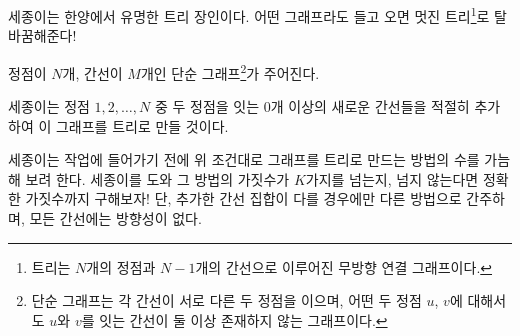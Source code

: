 세종이는 한양에서 유명한 트리 장인이다. 어떤 그래프라도 들고 오면 멋진 트리\footnote{트리는 $N$개의 정점과 $N-1$개의 간선으로 이루어진 무방향 연결 그래프이다.}로 탈바꿈해준다!

정점이 $N$개, 간선이 $M$개인 단순 그래프\footnote{단순 그래프는 각 간선이 서로 다른 두 정점을 이으며, 어떤 두 정점 $u$, $v$에 대해서도 $u$와 $v$를 잇는 간선이 둘 이상 존재하지 않는 그래프이다.}가 주어진다.

세종이는 정점 $1, 2, \ldots, N$ 중 두 정점을 잇는 $0$개 이상의 새로운 간선들을 적절히 추가하여 이 그래프를 트리로 만들 것이다.

세종이는 작업에 들어가기 전에 위 조건대로 그래프를 트리로 만드는 방법의 수를 가늠해 보려 한다. 세종이를 도와 그 방법의 가짓수가 $K$가지를 넘는지, 넘지 않는다면 정확한 가짓수까지 구해보자! 단, 추가한 간선 집합이 다를 경우에만 다른 방법으로 간주하며, 모든 간선에는 방향성이 없다.